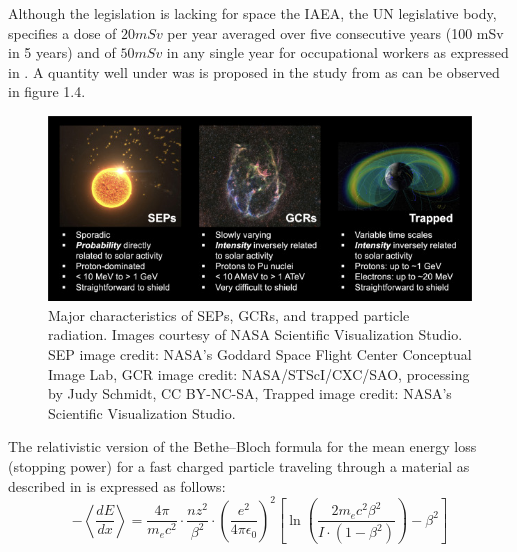 \documentclass[12pt,a4paper]{report}
\begin{document}
Although the legislation is lacking for space the IAEA, the UN legislative body, specifies a dose of $20mSv$ per year averaged over five consecutive years (100 mSv in 5 years) and of $50mSv$ in any single year for occupational workers as expressed in \citet{IAEA-GSG}. A quantity well under was is proposed in the study from \citet{hoffman1997} as can be observed in figure 1.4. 

\begin{figure}[hbtp]
\centering
\includegraphics[scale=1]{img/Major characteristics of SEPs GCRs and trapped particle radiation.jpg}
\caption{Major characteristics of SEPs, GCRs, and trapped particle radiation. Images courtesy of NASA Scientific Visualization Studio. SEP image credit: NASA’s Goddard Space
Flight Center Conceptual Image Lab, GCR image credit: NASA/STScI/CXC/SAO, processing by Judy Schmidt, CC BY-NC-SA, Trapped image credit: NASA’s Scientific Visualization
Studio.}
\end{figure}

\newpage

The relativistic version of the Bethe–Bloch formula for the mean energy loss (stopping power) for a fast charged particle traveling through a material as described in  \citet{groom2000passage} is expressed as follows:
\begin{equation}
- \left\langle \frac{dE}{dx} \right\rangle = \frac{4\pi}{m_e c^2} \cdot \frac{n z^2}{\beta^2} \cdot \left(\frac{e^2}{4\pi \epsilon_0}\right)^2 \left[ \ln\left( \frac{2 m_e c^2 \beta^2}{I\cdot (1-\beta^2)} \right) - \beta^2 \right]
\end{equation}
\end{document}
